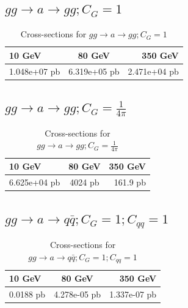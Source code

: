 \documentclass[12pt,a4paper]{article}
\begin{document}
\subsection{$g g \rightarrow a \rightarrow g g ; C_G = 1$}

\begin{table}[h!]
\begin{center}
\label{tab : table11}
\begin{tabular}{l|c|r}
\hline
\textbf{10 GeV} & \textbf{80 GeV} & \textbf{350 GeV}\\
\hline
1.048e+07 pb & 6.319e+05 pb  & 2.471e+04 pb  \\
\hline
\end{tabular}
\caption{Cross-sections for $g g \rightarrow a \rightarrow g g ; C_G = 1$ }
\end{center}
\end{table}
\pagebreak
\subsection{$g g \rightarrow a \rightarrow g g ; C_G = \frac{1}{4\pi}$}

\begin{table}[h!]
\begin{center}
\label{tab : table12}
\begin{tabular}{l|c|r}
\hline
\textbf{10 GeV} & \textbf{80 GeV} & \textbf{350 GeV}\\
\hline
6.625e+04 pb & 4024 pb  & 161.9 pb  \\
\hline
\end{tabular}
\caption{Cross-sections for $g g \rightarrow a \rightarrow g g ; C_G = \frac{1}{4\pi} $ }
\end{center}
\end{table}

\subsection{$g g \rightarrow a \rightarrow q \bar{q} ; C_G = 1 ; C_{qq} =1 $}

\begin{table}[h!]
\begin{center}
\label{tab : table13}
\begin{tabular}{l|c|r}
\hline
\textbf{10 GeV} & \textbf{80 GeV} & \textbf{350 GeV}\\
\hline
 0.0188 pb & 4.278e-05  pb  & 1.337e-07   pb  \\
\hline
\end{tabular}
\caption{Cross-sections for $g g \rightarrow a \rightarrow q \bar{q} ; C_G = 1 ;C_{qq} =1 $ }
\end{center}
\end{table}
\end{document}
